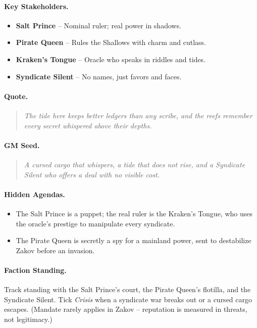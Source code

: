 \paragraph{Key Stakeholders.}
\begin{itemize}
  \item \textbf{Salt Prince} -- Nominal ruler; real power in shadows.
  \item \textbf{Pirate Queen} -- Rules the Shallows with charm and cutlass.
  \item \textbf{Kraken's Tongue} -- Oracle who speaks in riddles and tides.
  \item \textbf{Syndicate Silent} -- No names, just favors and faces.
\end{itemize}

\paragraph{Quote.}
\begin{quote}
\emph{\textquotedbl The tide here keeps better ledgers than any scribe, and the reefs remember every secret whispered above their depths.\textquotedbl}
\end{quote}

\paragraph{GM Seed.}
\begin{quote}
\emph{A cursed cargo that whispers, a tide that does not rise, and a Syndicate Silent who offers a deal with no visible cost.}
\end{quote}

\paragraph{Hidden Agendas.}
\begin{itemize}
  \item The Salt Prince is a puppet; the real ruler is the Kraken's Tongue, who uses the oracle's prestige to manipulate every syndicate.
  \item The Pirate Queen is secretly a spy for a mainland power, sent to destabilize Zakov before an invasion.
\end{itemize}

\paragraph{Faction Standing.}
Track standing with the Salt Prince's court, the Pirate Queen's flotilla, and the Syndicate Silent. Tick \textit{Crisis} when a syndicate war breaks out or a cursed cargo escapes. (Mandate rarely applies in Zakov -- reputation is measured in threats, not legitimacy.)


